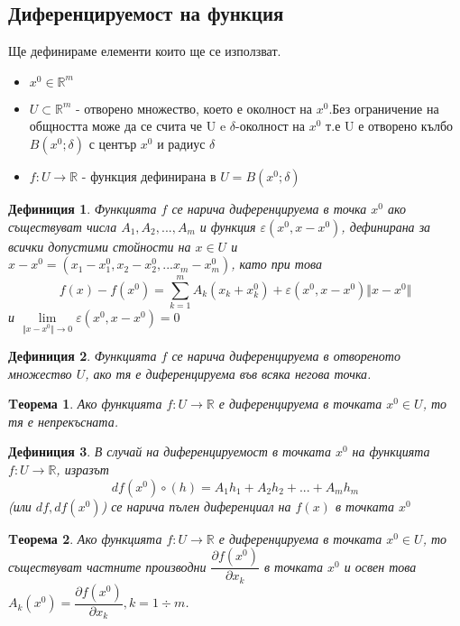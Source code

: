 \documentclass[fleqn,12pt]{article}
\newtheorem{theorem}{Tеорема}[subsection]
\newtheorem{definition}{Дефиниция}[subsection]
\begin{document}
\subsection{Диференцируемост на функция}
Ще дефинираме елементи които ще се използват. 
\begin{itemize}
	\item $x^0 \in \mathbb{R}^m$
	\item $U \subset \mathbb{R}^m$ - отворено множество, което е околност на $x^0$.Без ограничение на общността може да се счита че U e $\delta$-околност на $x^0$ т.е U е отворено кълбо $B(x^0;\delta)$ с център $x^0$ и радиус $\delta$
	\item $f: U \to \mathbb{R}$ - функция дефинирана в $U = B(x^0;\delta) $
\end{itemize}

\begin{definition}
Функцията $f$ се нарича диференцируема в точка $x^0$ ако съществуват числа $A_1, A_2, ..., A_m$ и функция $\varepsilon (x^0, x - x^0)$, дефинирана за всички допустими стойности на $x \in U$ и $x - x^0 = (x_1 - x_1 ^0, x_2 - x_2 ^0,... x_m - x_m ^0)$, като при това 
$$f(x) - f(x^0) = \sum_{k=1}^{m} A_k(x_k + x_k ^ 0) + \varepsilon (x^0, x - x^0) \Vert x - x^0 \Vert$$ 
и $\lim\limits_{\Vert x - x^0 \Vert \to 0}\varepsilon (x^0, x - x^0) = 0$
\end{definition}

\begin{definition}
Функцията $f$ се нарича диференцируема в отвореното множество $U$, ако тя е диференцируема във всяка негова точка. 
\end{definition}

\begin{theorem}
Ако функцията $f: U \to \mathbb{R}$ е диференцируема в точката $x^0 \in U$, то тя е непрекъсната. 
\end{theorem}

\begin{definition}
В случай на диференцируемост в точката $x^0$ на функцията $f: U \to \mathbb{R}$, изразът 
$$df(x^0) \circ (h) = A_1 h_1 + A_2 h_2 + ... + A_m h_m$$
(или $df, df(x^0)$) се нарича пълен диференциал на $f(x)$ в точката $x^0$
\end{definition}

\begin{theorem}
Ако функцията $f: U \to \mathbb{R}$ е диференцируема в точката $x^0 \in U$, то съществуват частните производни $\dfrac{\partial f(x^0)}{\partial x_k}$ в точката $x^0$ и освен това $A_k(x^0) = \dfrac{\partial f(x^0)}{\partial x_k}, k = 1 \div m$.
\end{theorem}
\end{document}
